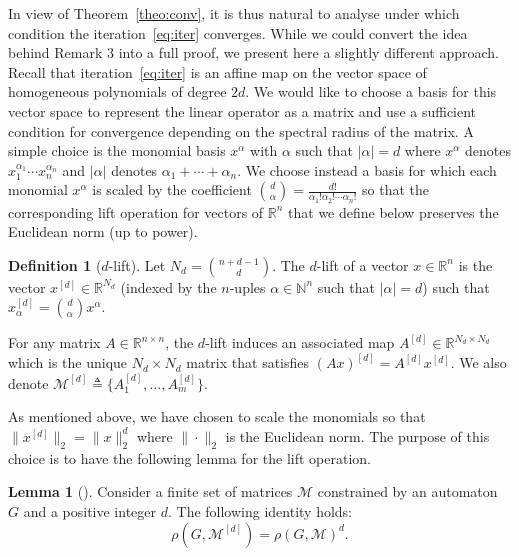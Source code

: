 \documentclass{sig-alternate-05-2015}
\newcommand{\1}{\mathbf{1}}
\theoremstyle{definition}
\newtheorem{mylemm}{Lemma}
\newtheorem{mydef}{Definition}
\newcommand{\R}{\mathbb{R}}
\newcommand{\A}{\mathcal{M}}
\newcommand{\G}{G}
\newcommand{\cjsr}{\rho(\G,\A)}
\newcommand{\eqdef}{\triangleq}
\newcommand{\defAG   }{a finite set of matrices $\A$ constrained by an automaton $\G$}
\begin{document}
In view of Theorem~\ref{theo:conv}, it is thus natural to analyse
under which condition the iteration~\ref{eq:iter} converges. While we
could convert the idea behind Remark 3 into a full proof, we present
here a slightly different approach. Recall that
iteration~\ref{eq:iter} is an affine map on the vector space of
homogeneous polynomials of degree $2d$.  We would like to choose a
basis for this vector space to represent the linear operator as a
matrix and use a sufficient condition for convergence depending on the
spectral radius of the matrix.  A simple choice is the monomial basis
$x^\alpha$ with $\alpha$ such that $|\alpha| = d$ where $x^\alpha$
denotes $x_1^{\alpha_1}\cdots x_n^{\alpha_n}$ and $|\alpha|$ denotes
$\alpha_1 + \cdots + \alpha_n$.  We choose instead a basis for which
each monomial $x^\alpha$ is scaled by the coefficient ${d \choose
  \alpha} = \frac{d!}{\alpha_1!\alpha_2!\cdots\alpha_n!}$ so that the
corresponding lift operation for vectors of $\R^n$ that we define
below preserves the Euclidean norm (up to power).

\begin{mydef}[$d$-lift]
  Let $N_d = {n+d-1 \choose d}$.
  The $d$-lift of a vector $x \in \R^n$ is the vector $x^{[d]} \in \R^{N_d}$
  (indexed by the $n$-uples $\alpha \in \mathbb{N}^n$
  such that $|\alpha| = d$)
  such that
  \( x_\alpha^{[d]} = {d \choose \alpha} x^\alpha. \)
\end{mydef}

For any matrix $A \in \R^{n \times n}$, the $d$-lift induces an associated map $A^{[d]} \in \R^{N_d \times N_d}$
which is the unique $N_d \times N_d$ matrix that satisfies $(Ax)^{[d]} = A^{[d]}x^{[d]}$.
We also denote $\A^{[d]} \eqdef \{A_1^{[d]}, \ldots, A_m^{[d]}\}$.

As mentioned above, we have chosen to scale the monomials so that $\|x^{[d]}\|_2 = \|x\|_2^d$ where $\|\cdot\|_{2}$ is the Euclidean norm.
The purpose of this choice is to have the following lemma for the lift operation.
\begin{mylemm}[{\cite[Lemma~3.5]{philippe2015stability}}]
  \label{lemm:Ad}
  Consider \defAG{} and a positive integer $d$.
  The following identity holds:
  \[ \rho(\G, \A^{[d]}) = \cjsr^d. \]
\end{mylemm}
\end{document}
